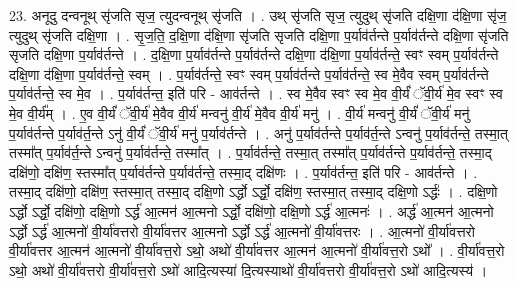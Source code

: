 \documentclass[17pt]{extarticle}
\begin{document}
23. अनूदु दन्वनूथ् सृ॑जति सृज॒ त्युदन्वनूथ् सृ॑जति । . उथ् सृ॑जति सृज॒ त्युदुथ् सृ॑जति दक्षि॒णा द॑क्षि॒णा सृ॑ज॒ त्युदुथ् सृ॑जति दक्षि॒णा । . सृ॒ज॒ति॒ द॒क्षि॒णा द॑क्षि॒णा सृ॑जति सृजति दक्षि॒णा प॒र्याव॑र्तन्ते प॒र्याव॑र्तन्ते दक्षि॒णा सृ॑जति सृजति दक्षि॒णा प॒र्याव॑र्तन्ते । . द॒क्षि॒णा प॒र्याव॑र्तन्ते प॒र्याव॑र्तन्ते दक्षि॒णा द॑क्षि॒णा प॒र्याव॑र्तन्ते॒ स्वꣳ स्वम् प॒र्याव॑र्तन्ते दक्षि॒णा द॑क्षि॒णा प॒र्याव॑र्तन्ते॒ स्वम् । . प॒र्याव॑र्तन्ते॒ स्वꣳ स्वम् प॒र्याव॑र्तन्ते प॒र्याव॑र्तन्ते॒ स्व मे॒वैव स्वम् प॒र्याव॑र्तन्ते प॒र्याव॑र्तन्ते॒ स्व मे॒व । . प॒र्याव॑र्तन्त॒ इति॑ परि - आव॑र्तन्ते । . स्व मे॒वैव स्वꣳ स्व मे॒व वी॒र्यं॑ ॅवी॒र्य॑ मे॒व स्वꣳ स्व मे॒व वी॒र्य᳚म् । . ए॒व वी॒र्यं॑ ॅवी॒र्य॑ मे॒वैव वी॒र्य॑ मन्वनु॑ वी॒र्य॑ मे॒वैव वी॒र्य॑ मनु॑ । . वी॒र्य॑ मन्वनु॑ वी॒र्यं॑ ॅवी॒र्य॑ मनु॑ प॒र्याव॑र्तन्ते प॒र्याव॑र्त॒न्ते ऽनु॑ वी॒र्यं॑ ॅवी॒र्य॑ मनु॑ प॒र्याव॑र्तन्ते । . अनु॑ प॒र्याव॑र्तन्ते प॒र्याव॑र्त॒न्ते ऽन्वनु॑ प॒र्याव॑र्तन्ते॒ तस्मा॒त् तस्मा᳚त् प॒र्याव॑र्त॒न्ते ऽन्वनु॑ प॒र्याव॑र्तन्ते॒ तस्मा᳚त् । . प॒र्याव॑र्तन्ते॒ तस्मा॒त् तस्मा᳚त् प॒र्याव॑र्तन्ते प॒र्याव॑र्तन्ते॒ तस्मा॒द् दक्षि॑णो॒ दक्षि॑ण॒ स्तस्मा᳚त् प॒र्याव॑र्तन्ते प॒र्याव॑र्तन्ते॒ तस्मा॒द् दक्षि॑णः । . प॒र्याव॑र्तन्त॒ इति॑ परि - आव॑र्तन्ते । . तस्मा॒द् दक्षि॑णो॒ दक्षि॑ण॒ स्तस्मा॒त् तस्मा॒द् दक्षि॒णो ऽर्द्धो ऽर्द्धो॒ दक्षि॑ण॒ स्तस्मा॒त् तस्मा॒द् दक्षि॒णो ऽर्द्धः॑ । . दक्षि॒णो ऽर्द्धो ऽर्द्धो॒ दक्षि॑णो॒ दक्षि॒णो ऽर्द्ध॑ आ॒त्मन॑ आ॒त्मनो ऽर्द्धो॒ दक्षि॑णो॒ दक्षि॒णो ऽर्द्ध॑ आ॒त्मनः॑ । . अर्द्ध॑ आ॒त्मन॑ आ॒त्मनो ऽर्द्धो ऽर्द्ध॑ आ॒त्मनो॑ वी॒र्या॑वत्तरो वी॒र्या॑वत्तर आ॒त्मनो ऽर्द्धो ऽर्द्ध॑ आ॒त्मनो॑ वी॒र्या॑वत्तरः । . आ॒त्मनो॑ वी॒र्या॑वत्तरो वी॒र्या॑वत्तर आ॒त्मन॑ आ॒त्मनो॑ वी॒र्या॑वत्त॒रो ऽथो॒ अथो॑ वी॒र्या॑वत्तर आ॒त्मन॑ आ॒त्मनो॑ वी॒र्या॑वत्त॒रो ऽथो᳚ । . वी॒र्या॑वत्त॒रो ऽथो॒ अथो॑ वी॒र्या॑वत्तरो वी॒र्या॑वत्त॒रो ऽथो॑ आदि॒त्यस्या॑ दि॒त्यस्याथो॑ वी॒र्या॑वत्तरो वी॒र्या॑वत्त॒रो ऽथो॑ आदि॒त्यस्य॑ । \newline
\end{document}
